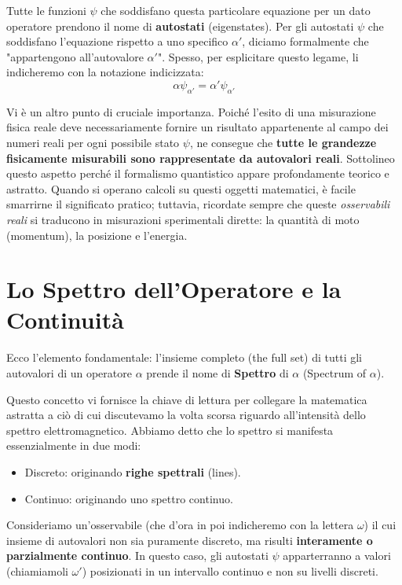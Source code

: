 Tutte le funzioni $\psi$ che soddisfano questa particolare equazione per un dato operatore prendono il nome di \textbf{autostati} (eigenstates). Per gli autostati $\psi$ che soddisfano l'equazione rispetto a uno specifico $\alpha'$, diciamo formalmente che "appartengono all'autovalore $\alpha'$". Spesso, per esplicitare questo legame, li indicheremo con la notazione indicizzata:
\begin{equation}
\alpha \psi_{\alpha'} = \alpha' \psi_{\alpha'}
\end{equation}

Vi è un altro punto di cruciale importanza. Poiché l'esito di una misurazione fisica reale deve necessariamente fornire un risultato appartenente al campo dei numeri reali per ogni possibile stato $\psi$, ne consegue che \textbf{tutte le grandezze fisicamente misurabili sono rappresentate da autovalori reali}.
Sottolineo questo aspetto perché il formalismo quantistico appare profondamente teorico e astratto. Quando si operano calcoli su questi oggetti matematici, è facile smarrirne il significato pratico; tuttavia, ricordate sempre che queste \textit{osservabili reali} si traducono in misurazioni sperimentali dirette: la quantità di moto (momentum), la posizione e l'energia.

\section{Lo Spettro dell'Operatore e la Continuità}

Ecco l'elemento fondamentale: l'insieme completo (the full set) di tutti gli autovalori di un operatore $\alpha$ prende il nome di \textbf{Spettro} di $\alpha$ (Spectrum of $\alpha$).

Questo concetto vi fornisce la chiave di lettura per collegare la matematica astratta a ciò di cui discutevamo la volta scorsa riguardo all'intensità dello spettro elettromagnetico. Abbiamo detto che lo spettro si manifesta essenzialmente in due modi:
\begin{itemize}
\item Discreto: originando \textbf{righe spettrali} (lines).
\item Continuo: originando uno spettro continuo.
\end{itemize}

Consideriamo un'osservabile (che d'ora in poi indicheremo con la lettera $\omega$) il cui insieme di autovalori non sia puramente discreto, ma risulti \textbf{interamente o parzialmente continuo}.
In questo caso, gli autostati $\psi$ apparterranno a valori (chiamiamoli $\omega'$) posizionati in un intervallo continuo e non su livelli discreti.

